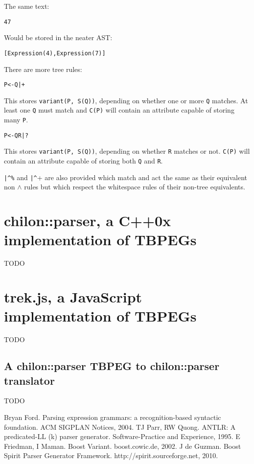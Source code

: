 \documentclass[a4paper,11pt]{article}
\begin{document}
The same text:
\begin{alltt}
    4 7
\end{alltt}

Would be stored in the neater AST:
\begin{alltt}
    [ Expression(4), Expression(7) ]
\end{alltt}

There are more tree rules:
\begin{alltt}
    P <- Q|+
\end{alltt}

This stores \verb+variant(P, S(Q))+, depending on whether one or more \verb+Q+ matches.
At least one \verb+Q+ must match and \verb+C(P)+ will contain an attribute capable of storing many \verb+P+.

\begin{alltt}
    P <- Q R|?
\end{alltt}

This stores \verb+variant(P, S(Q))+, depending on whether \verb+R+ matches or not.
\verb+C(P)+ will contain an attribute capable of storing both \verb+Q+ and \verb+R+.

\verb+|^%+ and \verb+|^++ are also provided which match and act the same as their equivalent non $\wedge$ rules but which respect the whitespace rules of their non-tree equivalents.

\section{chilon::parser, a C++0x implementation of TBPEGs}
TODO

\section{trek.js, a JavaScript implementation of TBPEGs}
TODO

\subsection{A chilon::parser TBPEG to chilon::parser translator}
TODO

\begin{thebibliography}{9}
 Bryan Ford. Parsing expression grammars: a recognition-based syntactic foundation. ACM SIGPLAN Notices, 2004.
 TJ Parr, RW Quong. ANTLR: A predicated-LL (k) parser generator. Software-Practice and Experience, 1995.
 E Friedman, I Maman. Boost Variant. boost.cowic.de, 2002.
 J de Guzman. Boost Spirit Parser Generator Framework. http://spirit.sourceforge.net, 2010.
\end{thebibliography}
\end{document}
